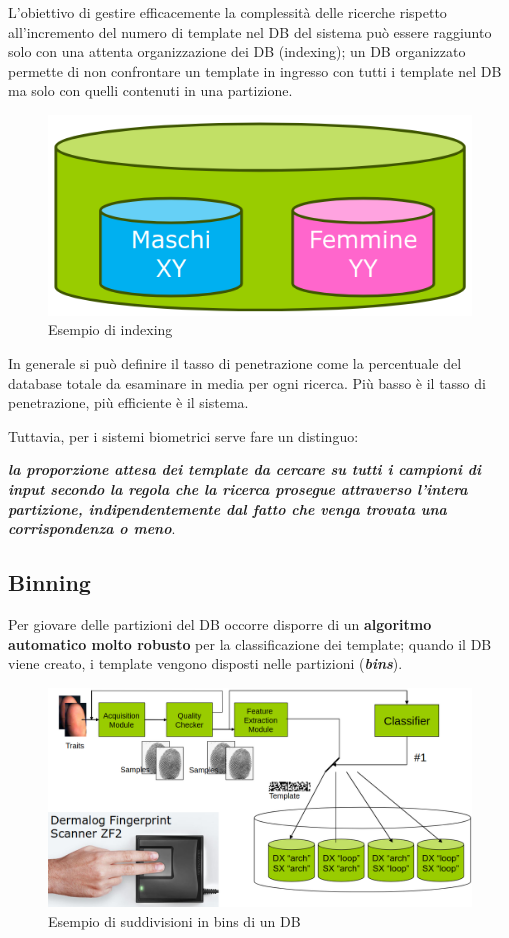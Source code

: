 \documentclass{report}
\begin{document}
L’obiettivo di gestire efficacemente la complessità delle
ricerche rispetto all’incremento del numero di template nel
DB del sistema può essere raggiunto solo con una attenta
organizzazione dei DB (indexing); un DB organizzato permette di non confrontare un
template in ingresso con tutti i template nel DB ma solo
con quelli contenuti in una partizione.

\begin{figure}[ht]
    \centering
    \includegraphics[width=0.75\linewidth]{images/indexing.png}
    \caption{Esempio di indexing}
\end{figure}

\noindent In generale si può definire il tasso di penetrazione come la
percentuale del database totale da esaminare in media per
ogni ricerca. Più basso è il tasso di penetrazione, più
efficiente è il sistema.

\noindent Tuttavia, per i sistemi biometrici serve fare un distinguo: 

\noindent \textit{\textbf{la proporzione attesa dei template da cercare su tutti i campioni di input secondo
la regola che la ricerca prosegue attraverso l'intera partizione, indipendentemente
dal fatto che venga trovata una corrispondenza o meno}}.

\subsection{Binning}

Per giovare delle partizioni del DB occorre disporre di un
\textbf{algoritmo automatico molto robusto} per la classificazione
dei template; quando il DB viene creato, i template vengono disposti nelle partizioni (\textbf{\textit{bins}}).

\begin{figure}[ht]
    \centering
    \includegraphics[width=1\linewidth]{images/binning.png}
    \caption{Esempio di suddivisioni in bins di un DB}
\end{figure}
\end{document}
